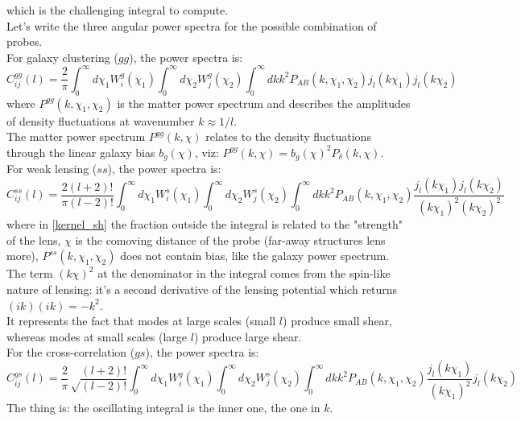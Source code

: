 which is the challenging integral to compute. \\
Let's write the three angular power spectra for the possible combination of probes. \\
For galaxy clustering ($gg$), the power spectra is:
\begin{equation}
    C_{ij}^{gg}(l) = \frac{2}{\pi} \int_0^{\infty} d\chi_1 W_i^g(\chi_1) \int_0^{\infty} d\chi_2 W_j^g(\chi_2) \int_0^{\infty} dk k^2 P_{AB}(k,\chi_1,\chi_2) j_l(k\chi_1) j_l(k\chi_2)
\label{eq15_blast}    
\end{equation}
where $P^{gg}(k,\chi_1, \chi_2)$ is the matter power spectrum and describes the amplitudes of density fluctuations at wavenumber $k \approx 1/l$. \\ 
The matter power spectrum $P^{gg}(k,\chi)$ relates to the density fluctuations through the linear galaxy bias $b_g(\chi)$, viz: $P^{gg}(k,\chi) = b_g(\chi)^2 P_{\delta}(k, \chi)$. \\
For weak lensing ($ss$), the power spectra is:
\begin{equation}
        C_{ij}^{ss}(l) = \frac{2(l+2)!}{\pi(l-2)!} \int_0^{\infty} d\chi_1 W_i^s(\chi_1) \int_0^{\infty} d\chi_2 W_j^s(\chi_2) \int_0^{\infty} dk k^2 P_{AB}(k,\chi_1,\chi_2) \frac{j_l(k\chi_1) j_l(k\chi_2)}{(k\chi_1)^2(k\chi_2)^2}
\label{eq17_blast}    
\end{equation}
where in \ref{kernel_sh} the fraction outside the integral is related to the "strength" of the lens, $\chi$ is the comoving distance of the probe (far-away structures lens more), $P^{ss}(k,\chi_1, \chi_2)$ does not contain bias, like the galaxy power spectrum. \\ 
The term $(k\chi)^2$ at the denominator in the integral comes from the spin-like nature of lensing: it's a second derivative of the lensing potential which returns $(ik)(ik) = -k^2$. \\
It represents the fact that modes at large scales (small $l$) produce small shear, whereas modes at small scales (large $l$) produce large shear. \\
For the cross-correlation ($gs$), the power spectra is:
\begin{equation}
        C_{ij}^{gs}(l) = \frac{2}{\pi} \sqrt\frac{(l+2)!}{(l-2)!} \int_0^{\infty} d\chi_1 W_i^g(\chi_1) \int_0^{\infty} d\chi_2 W_j^s(\chi_2) \int_0^{\infty} dk k^2 P_{AB}(k,\chi_1,\chi_2) \frac{j_l(k\chi_1)}{(k\chi_1)^2}j_l(k\chi_2)
\label{eq19_blast}    
\end{equation}
The thing is: the oscillating integral is the inner one, the one in $k$. \\
